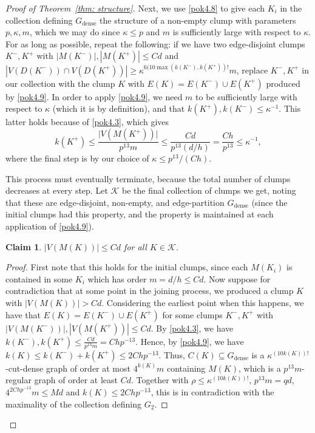 \documentclass[10pt]{article}
\newtheorem{claim}[theorem]{Claim}
\theoremstyle{definition}
\newcommand\ab[1]{\lvert#1\rvert}
\let\leq\leqslant
\let\geq\geqslant
\begin{document}
\begin{proof}[Proof of Theorem~\ref{thm: structure}]
Next, we use \cref{pok4.8} to give each $K_i$ in the collection defining $G_{\mathrm{dense}}$ the structure of a non-empty clump with parameters $p, \kappa, m$, which we may do since $\kappa \leq p$ and $m$ is sufficiently large with respect to $\kappa$. For as long as possible, repeat the following: if we have two edge-disjoint clumps $K^-, K^+$ with $|M(K^-)|, |M(K^+)|\leq Cd$ 
and $|V(D(K^-))\cap V(D(K^+))|\geq \kappa^{6(10\max(k(K^-), k(K^+))!} m$, replace $K^-, K^+$ in our collection with the clump $K$ with $E(K)=E(K^-)\cup E(K^+)$ produced by \cref{pok4.9}. In order to apply \cref{pok4.9}, we need $m$ to be sufficiently large with respect to $\kappa$ (which it is by definition), and that $k(K^+),k(K^-)\leq \kappa^{-1}$. This latter holds because of \cref{pok4.3}, which gives 
\[
k(K^+) \leq \frac{\ab{V(M(K^+))}}{p^{13}m} \leq \frac{Cd}{p^{13}(d/h)} = \frac{Ch}{p^{13}}\leq \kappa^{-1},
\]
where the final step is by our choice of $\kappa \leq p^{13}/(Ch)$.

This process must eventually terminate, because the total number of clumps decreases at every step.
Let $\mathcal K$ be the final collection of clumps we get, noting that these are edge-disjoint, non-empty, and edge-partition $G_{\mathrm{dense}}$ (since the initial clumps had this property, and the property is maintained at each application of \cref{pok4.9}).   


\begin{claim}\label{claim:M(Ki)_upper_bound}
$|V(M(K))|\leq Cd$ for all $K\in \mathcal K$.
\end{claim}
\begin{proof} 
First note that this holds for the initial clumps, since each $M(K_i)$ is contained in some $K_i$ which has order $m=d/h\leq Cd$. 
Now suppose for contradiction that at some point in the joining process, we produced a clump $K$ with $|V(M(K))|>Cd$. Considering the earliest point when this happens, we have that $E(K)=E(K^-)\cup E(K^+)$ for some clumps $K^-, K^+$ with $|V(M(K^-))|, |V(M(K^+))|\leq Cd$. By \cref{pok4.3}, we have $k(K^-), k(K^+)\leq \frac{Cd}{p^{13}m}=Chp^{-13}$. Hence, by \cref{pok4.9}, we have $k(K)\leq k(K^-)+k(K^+)\leq 2Chp^{-13}$. Thus, $C(K)\subseteq G_{\mathrm{dense}}$ is a $\kappa^{(10k(K))!}$-cut-dense graph of order at most $4^{k(K)}m$ containing $M(K)$, which is a $p^{13}m$-regular graph of order at least $Cd$. Together with $\rho \leq \kappa^{(10k(K))!}$, $p^{13}m=qd$, $4^{2Chp^{-13}}m\leq Md$ and $k(K)\leq 2Chp^{-13}$, this is in contradiction with the maximality of the collection defining $G_2$.
\end{proof}


\end{proof}
\end{document}
